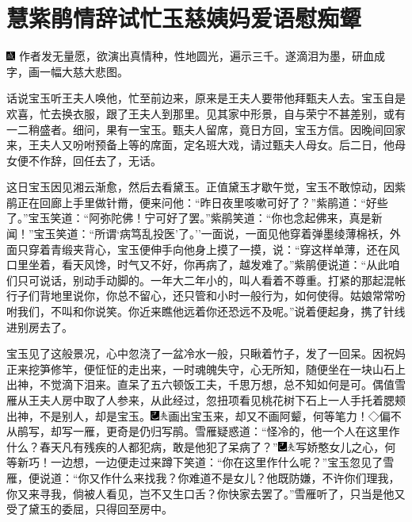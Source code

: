 
\chapter{慧紫鹃情辞试忙玉\hspace{.5em}慈姨妈爱语慰痴颦}

{\includegraphics[width=3mm]{../Images/00005}  \kaishu 作者发无量愿，欲演出真情种，性地圆光，遍示三千。遂滴泪为墨，研血成字，画一幅大慈大悲图。}

话说宝玉听王夫人唤他，忙至前边来，原来是王夫人要带他拜甄夫人去。宝玉自是欢喜，忙去换衣服，跟了王夫人到那里。见其家中形景，自与荣宁不甚差别，或有一二稍盛者。细问，果有一宝玉。甄夫人留席，竟日方回，宝玉方信。因晚间回家来，王夫人又吩咐预备上等的席面，定名班大戏，请过甄夫人母女。后二日，他母女便不作辞，回任去了，无话。

这日宝玉因见湘云渐愈，然后去看黛玉。正值黛玉才歇午觉，宝玉不敢惊动，因紫鹃正在回廊上手里做针黹，便来问他：``昨日夜里咳嗽可好了？''紫鹃道：``好些了。''宝玉笑道：``阿弥陀佛！宁可好了罢。''紫鹃笑道：``你也念起佛来，真是新闻！''宝玉笑道：``所谓`病笃乱投医'了。''一面说，一面见他穿着弹墨绫薄棉袄，外面只穿着青缎夹背心，宝玉便伸手向他身上摸了一摸，说：``穿这样单薄，还在风口里坐着，看天风馋，时气又不好，你再病了，越发难了。''紫鹃便说道：``从此咱们只可说话，别动手动脚的。一年大二年小的，叫人看着不尊重。打紧的那起混帐行子们背地里说你，你总不留心，还只管和小时一般行为，如何使得。姑娘常常吩咐我们，不叫和你说笑。你近来瞧他远着你还恐远不及呢。''说着便起身，携了针线进别房去了。

宝玉见了这般景况，心中忽浇了一盆冷水一般，只瞅着竹子，发了一回呆。因祝妈正来挖笋修竿，便怔怔的走出来，一时魂魄失守，心无所知，随便坐在一块山石上出神，不觉滴下泪来。直呆了五六顿饭工夫，千思万想，总不知如何是可。偶值雪雁从王夫人房中取了人参来，从此经过，忽扭项看见桃花树下石上一人手托着腮颊出神，不是别人，却是宝玉。{\includegraphics[width=3mm]{../Images/00003}\includegraphics[width=3mm]{../Images/00012}\footnotesize \kaishu 画出宝玉来，却又不画阿颦，何等笔力！◇偏不从鹃写，却写一雁，更奇是仍归写鹃。}雪雁疑惑道：``怪冷的，他一个人在这里作什么？春天凡有残疾的人都犯病，敢是他犯了呆病了？''{\includegraphics[width=3mm]{../Images/00003}\includegraphics[width=3mm]{../Images/00012}\footnotesize \kaishu 写娇憨女儿之心，何等新巧！}一边想，一边便走过来蹲下笑道：``你在这里作什么呢？''宝玉忽见了雪雁，便说道：``你又作什么来找我？你难道不是女儿？他既防嫌，不许你们理我，你又来寻我，倘被人看见，岂不又生口舌？你快家去罢了。''雪雁听了，只当是他又受了黛玉的委屈，只得回至房中。

